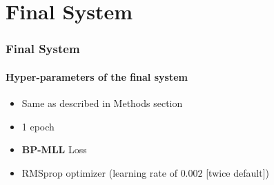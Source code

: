 \newcommand{\fisys}{Final System}
\section{\fisys}

\begin{frame}
	\frametitle{\fisys}
	\framesubtitle{Hyper-parameters of the final system}
	\begin{itemize}
		\item Same as described in Methods section
		\item 1 epoch
		\item \textbf{BP-MLL} Loss
		\item RMSprop optimizer
			(learning rate of $0.002$ [twice default])
	\end{itemize}
\end{frame}
